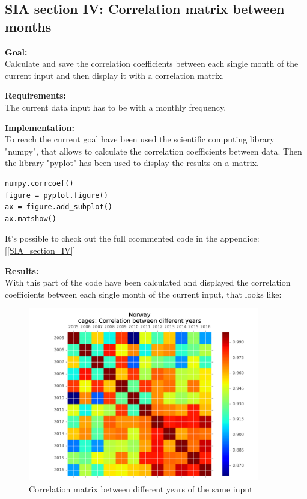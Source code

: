 \newpage
\subsection{SIA section IV: Correlation matrix between months}

\textbf{Goal:}\\
Calculate and save the correlation coefficients between each single month of the current input and then display it with a correlation matrix.

\textbf{Requirements:}\\
The current data input has to be with a monthly frequency. 

\textbf{Implementation:}\\
To reach the current goal have been used the scientific computing library "numpy", that allows to calculate the correlation coefficients between data. Then the library "pyplot" has been used to display the results on a matrix.
\begin{lstlisting}
numpy.corrcoef()
figure = pyplot.figure()
ax = figure.add_subplot()
ax.matshow()
\end{lstlisting}

It's possible to check out the full ccommented code in the appendice: [\ref{SIA_section_IV}]


\textbf{Results:} \\
With this part of the code have been calculated and displayed the correlation coefficients between each single month of the current input, that looks like: 

\begin{figure}[H]
	\centering
    \includegraphics[width=0.9\textwidth]{Files/Cages_Years_Matrix.pdf}
    \caption{Correlation matrix between different years of the same input}
\end{figure}


